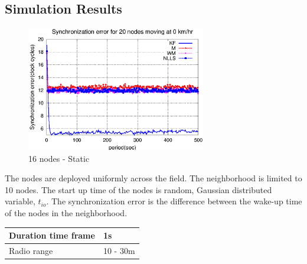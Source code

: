 \documentclass[a4paper,10pt]{report}
\begin{document}
\subsection{\textbf{Simulation Results}}
\begin{figure}[!h]
\centering
\includegraphics[width=0.7\textwidth]{16output-s0}
\caption{16 nodes - Static} \label{16output0}
\end{figure}
The nodes are deployed uniformly across the field. The neighborhood
is limited to 10 nodes. The start up time of the nodes is random,
Gaussian distributed variable, $t_{io}$. The synchronization error
is the difference between the wake-up time of the nodes in the
neighborhood.
\newline
\begin{center}
    \begin{tabular}{ | l | l |}
    \hline
    Duration time frame & 1s \\ \hline
    Radio range & 10 - 30m \\ \hline
    \end{tabular}
\end{center}
\end{document}
